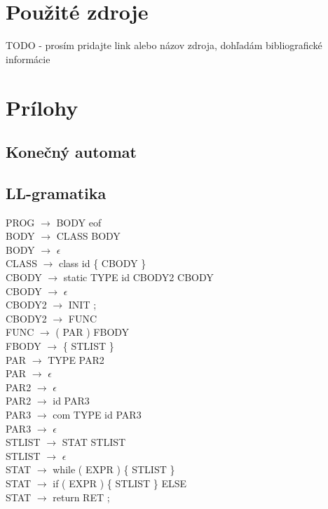 \documentclass[11pt,a4paper]{article}
\begin{document}
\section{Použité zdroje}

TODO - prosím pridajte link alebo názov zdroja, dohľadám bibliografické informácie

\newpage
\section{Prílohy}


\subsection{Konečný automat}


\newpage

\subsection{LL-gramatika}
PROG $\rightarrow$ BODY eof \\
BODY $\rightarrow$ CLASS BODY \\
BODY $\rightarrow$ $\epsilon$ \\
CLASS $\rightarrow$ class id \{ CBODY \} \\
CBODY $\rightarrow$ static TYPE id CBODY2 CBODY \\
CBODY $\rightarrow$ $\epsilon$ \\
CBODY2 $\rightarrow$ INIT ; \\
CBODY2 $\rightarrow$ FUNC \\
FUNC $\rightarrow$ ( PAR ) FBODY \\
FBODY $\rightarrow$ \{ STLIST \} \\
PAR $\rightarrow$ TYPE PAR2 \\
PAR $\rightarrow$ $\epsilon$ \\
PAR2 $\rightarrow$ $\epsilon$ \\
PAR2 $\rightarrow$ id PAR3 \\
PAR3 $\rightarrow$ com TYPE id PAR3 \\
PAR3 $\rightarrow$ $\epsilon$ \\
STLIST $\rightarrow$ STAT STLIST \\
STLIST $\rightarrow$  $\epsilon$ \\
STAT $\rightarrow$ while ( EXPR ) \{ STLIST \} \\
STAT $\rightarrow$ if ( EXPR ) \{ STLIST \} ELSE \\
STAT $\rightarrow$ return RET ; \\
\end{document}
